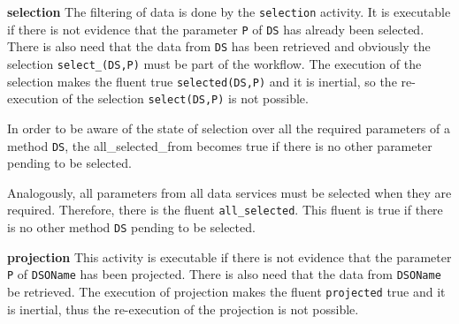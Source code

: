 %



\textbf{selection} The filtering of data is done by the \texttt{selection} activity. It is executable if there is not evidence that the parameter \texttt{P} of \texttt{DS} has already been selected. There is also need that the data from \texttt{DS} has been retrieved and obviously the selection \texttt{select_(DS,P)} must be part of the workflow. The execution of the selection makes the fluent true \texttt{selected(DS,P)} and it is inertial, so the re-execution of the selection \texttt{select(DS,P)} is not possible.

%



In order to be aware of the state of selection over all the required parameters of a method \texttt{DS}, the all_selected_from becomes true if there is no other parameter pending to be selected.

%



Analogously, all parameters from all data services must be selected when they are required. Therefore, there is the fluent \texttt{all\_selected}. This fluent is true if there is no other method \texttt{DS} pending to be selected.

%



\textbf{projection} This activity is executable if there is not evidence that the parameter \texttt{P} of \texttt{DSOName} has been projected. There is also need that the data from \texttt{DSOName} be retrieved. The execution of projection makes the fluent \texttt{projected} true and it is inertial, thus the re-execution of the projection is not possible.
               
